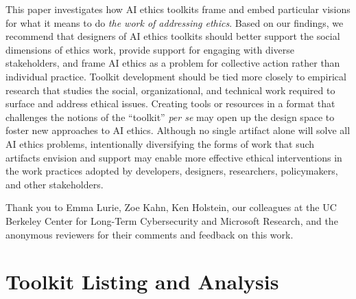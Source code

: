 \documentclass[acmsmall]{acmart}
\begin{document}
This paper investigates how AI ethics toolkits frame and embed particular visions for what it means to do \textit{the work of addressing ethics}. Based on our findings, we recommend that designers of AI ethics toolkits should better support the social dimensions of ethics work, provide support for engaging with diverse stakeholders, and frame AI ethics as a problem for collective action rather than individual practice. Toolkit development should be tied more closely to empirical research that studies the social, organizational, and technical work required to surface and address ethical issues. Creating tools or resources in a format that challenges the notions of the ``toolkit'' \textit{per se} may open up the design space to foster new approaches to AI ethics. Although no single artifact alone will solve all AI ethics problems, intentionally diversifying the forms of work that such artifacts envision and support may enable more effective ethical interventions in the work practices adopted by developers, designers, researchers, policymakers, and other stakeholders. 

\begin{acks}
Thank you to Emma Lurie, Zoe Kahn, Ken Holstein, our colleagues at the UC Berkeley Center for Long-Term Cybersecurity and Microsoft Research, and the anonymous reviewers for their comments and feedback on this work.
\end{acks}




\appendix

\section{Toolkit Listing and Analysis}
\label{section:toolkit-list}
\end{document}
